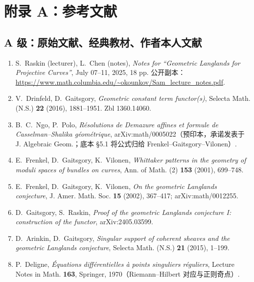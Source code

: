 \raggedright

\section*{附录 A：参考文献}

\subsection*{A 级：原始文献、经典教材、作者本人文献}
\begin{enumerate}
\item S.~Raskin (lecturer), L.~Chen (notes), \emph{Notes for ``Geometric Langlands for Projective Curves''},
July 07--11, 2025, 18 pp. 公开副本：
\url{https://www.math.columbia.edu/~okounkov/Sam_lecture_notes.pdf}.
\item V.~Drinfeld, D.~Gaitsgory, \emph{Geometric constant term functor(s)},
Selecta Math. (N.S.) \textbf{22} (2016), 1881--1951. Zbl 1360.14060.
\item B.~C.~Ngo, P.~Polo, \emph{Résolutions de Demazure affines et formule de Casselman--Shalika géométrique},
arXiv:math/0005022（预印本，承诺发表于 J. Algebraic Geom.；底本 §5.1 将公式归给 Frenkel--Gaitsgory--Vilonen）.
\item E.~Frenkel, D.~Gaitsgory, K.~Vilonen, \emph{Whittaker patterns in the geometry of moduli spaces of bundles on curves},
Ann. of Math. (2) \textbf{153} (2001), 699--748.
\item E.~Frenkel, D.~Gaitsgory, K.~Vilonen, \emph{On the geometric Langlands conjecture},
J. Amer. Math. Soc. \textbf{15} (2002), 367--417; arXiv:math/0012255.
\item D.~Gaitsgory, S.~Raskin, \emph{Proof of the geometric Langlands conjecture I: construction of the functor},
arXiv:2405.03599.
\item D.~Arinkin, D.~Gaitsgory, \emph{Singular support of coherent sheaves and the geometric Langlands conjecture},
Selecta Math. (N.S.) \textbf{21} (2015), 1--199.
\item P.~Deligne, \emph{Équations différentielles à points singuliers réguliers},
Lecture Notes in Math. \textbf{163}, Springer, 1970（Riemann--Hilbert 对应与正则奇点）.
\end{enumerate}

